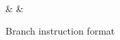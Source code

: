 \begin{figure}[h]
	\centering
	\begin{bytefield}[bitwidth=0.05\linewidth]{16}
		 \\
		 &
		 &
	\end{bytefield}

	\caption{Branch instruction format}
	\label{fig:new_branch_format}
\end{figure}

